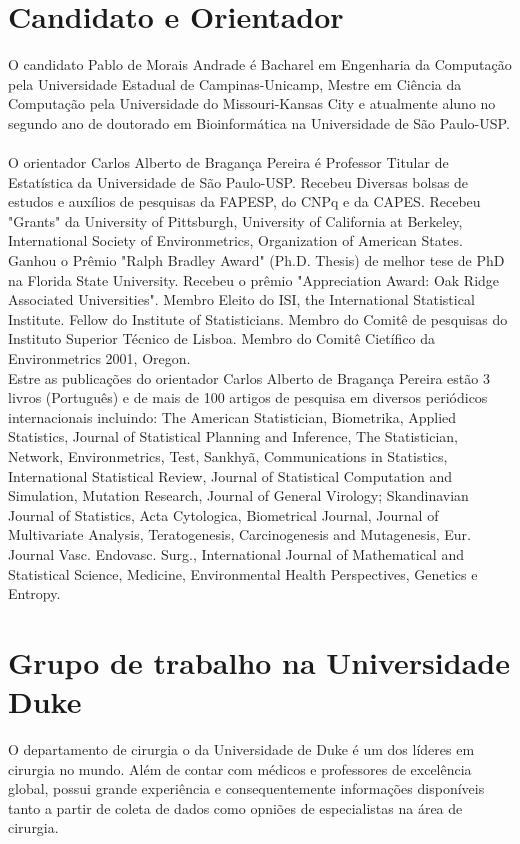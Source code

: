 \documentclass{article}
\begin{document}
\section{ \label{sec:projeto} Candidato e Orientador}
O candidato Pablo de Morais Andrade é Bacharel em Engenharia da Computação pela Universidade Estadual de 
Campinas-Unicamp, Mestre em Ciência da Computação pela Universidade do Missouri-Kansas City e atualmente 
aluno no segundo ano de doutorado em Bioinformática na Universidade de São Paulo-USP.\\
\\
O orientador Carlos Alberto de Bragança Pereira é Professor Titular de Estatística da Universidade de São Paulo-USP. 
Recebeu Diversas bolsas de estudos e auxílios de pesquisas da FAPESP, do CNPq e da CAPES. 
Recebeu "Grants" da University of Pittsburgh, University of California at Berkeley, 
International Society of Environmetrics, Organization of American States. 
Ganhou o Prêmio "Ralph Bradley Award" (Ph.D. Thesis) de melhor tese de PhD na Florida State University. 
Recebeu o prêmio "Appreciation Award: Oak Ridge Associated Universities". Membro Eleito do ISI, 
the International Statistical Institute. Fellow do Institute of Statisticians. 
Membro do Comitê de pesquisas do Instituto Superior Técnico de Lisboa. Membro do Comitê Cietífico da 
Environmetrics 2001, Oregon.\\
Estre as publicações do orientador Carlos Alberto de Bragança Pereira estão 3 livros (Português) e 
de mais de 100 artigos de pesquisa em diversos periódicos internacionais incluindo: 
The American Statistician, Biometrika, Applied Statistics, Journal of Statistical Planning and Inference, 
The Statistician, Network, Environmetrics, Test, Sankhyã, Communications in Statistics, 
International Statistical Review, Journal of Statistical Computation and Simulation, Mutation Research, 
Journal of General Virology; Skandinavian Journal of Statistics, Acta Cytologica, Biometrical Journal, 
Journal of Multivariate Analysis, Teratogenesis, Carcinogenesis and Mutagenesis, Eur. Journal Vasc. Endovasc. Surg., 
International Journal of Mathematical and Statistical Science, Medicine, Environmental Health Perspectives, 
Genetics e Entropy.

\section{ \label{sec:duke} Grupo de trabalho na Universidade Duke}
O departamento de cirurgia o da Universidade de Duke é um dos líderes em cirurgia no mundo. 
Além de contar com médicos e professores de excelência global, possui grande experiência e consequentemente 
informações disponíveis tanto a partir de coleta de dados como opniões de especialistas na área de cirurgia.
\end{document}

